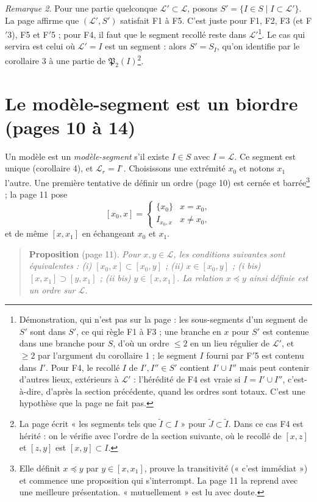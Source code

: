 \documentclass[11pt,a4paper]{article}
\begin{document}
\emph{Remarque 2.} Pour une partie quelconque $\mathcal{L}' \subset
\mathcal{L}$, posons $S' = \{I \in S \mid I \subset \mathcal{L}'\}$. La page
affirme que $(\mathcal{L}', S')$ satisfait F1 à F5. C'est juste pour F1, F2,
F3 (et F$'$3), F5 et F$'$5 ; pour F4, il faut que le segment recollé reste
dans $\mathcal{L}'$\footnote{Démonstration, qui n'est pas sur la page : les
sous-segments d'un segment de $S'$ sont dans $S'$, ce qui règle F1 à F3 ; une
branche en $x$ pour $S'$ est contenue dans une branche pour $S$, d'où un ordre
$\leq 2$ en un lieu régulier de $\mathcal{L}'$, et $\geq 2$ par l'argument du
corollaire 1 ; le segment $I$ fourni par F$'$5 est contenu dans $I'$. Pour
F4, le recollé $I$ de $I', I'' \in S'$ contient $I' \cup I''$ mais peut
contenir d'autres lieux, extérieurs à $\mathcal{L}'$ : l'hérédité de F4 est
vraie si $I = I' \cup I''$, c'est-à-dire, d'après la section précédente,
quand les ordres sont totaux. C'est une hypothèse que la page ne fait pas.}.
Le cas qui servira est celui où $\mathcal{L}' = I$ est un segment : alors $S'
= S_{I}$, qu'on identifie par le corollaire 3 à une partie de
$\mathfrak{P}_{2}(I)$\footnote{La page écrit « les segments tels que
$\widetilde{I} \subset I$ » pour $\widetilde{J} \subset \widetilde{I}$. Dans
ce cas F4 est hérité : on le vérifie avec l'ordre de la section suivante, où
le recollé de $[x,z]$ et $[z,y]$ est $[x,y] \subset I$.}.

\section*{Le modèle-segment est un biordre (pages 10 à 14)}

Un modèle est un \emph{modèle-segment} s'il existe $I \in S$ avec $I =
\mathcal{L}$. Ce segment est unique (corollaire 4), et $\mathcal{L}_{r} =
I^{\circ}$. Choisissons une extrémité $x_{0}$ et notons $x_{1}$ l'autre. Une
première tentative de définir un ordre (page 10) est cernée et
barrée\footnote{Elle définit $x \preccurlyeq y$ par $y \in [x,x_{1}]$, prouve
la transitivité (« c'est immédiat ») et commence une proposition qui
s'interrompt. La page 11 la reprend avec une meilleure présentation.
« mutuellement » est lu avec doute.} ; la page 11 pose
\[
[x_{0},x] = \begin{cases} \{x_{0}\} & x = x_{0}, \\ I_{x_{0},x} & x \neq x_{0},
\end{cases}
\]
et de même $[x,x_{1}]$ en échangeant $x_{0}$ et $x_{1}$.

\begin{quote}
\textbf{Proposition} (page 11). \emph{Pour $x, y \in \mathcal{L}$, les
conditions suivantes sont équivalentes : (i) $[x_{0},x] \subset [x_{0},y]$ ;
(ii) $x \in [x_{0},y]$ ; (i bis) $[x,x_{1}] \supset [y,x_{1}]$ ; (ii bis) $y
\in [x,x_{1}]$. La relation $x \preccurlyeq y$ ainsi définie est un ordre sur
$\mathcal{L}$.}
\end{quote}
\end{document}
